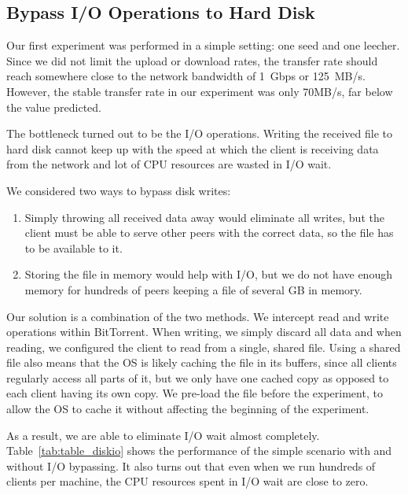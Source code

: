 \documentclass[10pt,letterpaper,twocolumn]{article}
\begin{document}
\subsection{Bypass I/O Operations to Hard Disk}
\label{sec:bypass-io-operations}


Our first experiment was performed in a simple setting:
one seed and one leecher. Since we did not limit the upload or
download rates, the transfer rate should reach somewhere close to the
network bandwidth of 1~Gbps or 125~MB/s. However, the stable transfer
rate in our experiment was only 70MB/s, far below the value predicted.

The bottleneck turned out to be the I/O operations. Writing the
received file to hard disk cannot keep up with the speed at which the
client is receiving data from the network and lot of CPU resources are
wasted in I/O wait. 



We considered two ways to bypass disk writes:
\begin{enumerate}
\item Simply throwing all received data away would eliminate all
  writes, but the client must be able to serve other peers with the
  correct data, so the file has to be available to it.
\item Storing the file in memory would help with I/O, but we do not
  have enough memory for hundreds of peers keeping a
  file of several GB in memory.
\end{enumerate}

Our solution is a combination of the two methods. We intercept read
and write operations within BitTorrent. When writing, we simply
discard all data and when reading, we configured the client to read
from a single, shared file. Using a shared file also means that the OS
is likely caching the file in its buffers, since all clients regularly
access all parts of it, but we only have one cached copy as opposed to
each client having its own copy. We pre-load the file before the
experiment, to allow the OS to cache it without affecting the
beginning of the experiment.

As a result, we are able to eliminate I/O wait almost
completely. Table~\ref{tab:table_diskio} shows the performance of the
simple scenario with and without I/O bypassing. It also turns out that
even when we run hundreds of clients per machine, the CPU resources
spent in I/O wait are close to zero.
\end{document}
